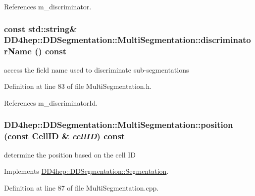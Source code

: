 References m\_\-discriminator.\hypertarget{class_d_d4hep_1_1_d_d_segmentation_1_1_multi_segmentation_a4be6f41c8a5f08fec8c2a5cc3cb47e6c}{
\subsubsection[{discriminatorName}]{\setlength{\rightskip}{0pt plus 5cm}const std::string\& DD4hep::DDSegmentation::MultiSegmentation::discriminatorName () const}}
\label{class_d_d4hep_1_1_d_d_segmentation_1_1_multi_segmentation_a4be6f41c8a5f08fec8c2a5cc3cb47e6c}


access the field name used to discriminate sub-\/segmentations 

Definition at line 83 of file MultiSegmentation.h.

References m\_\-discriminatorId.\hypertarget{class_d_d4hep_1_1_d_d_segmentation_1_1_multi_segmentation_abbcc00c36274bb97c5ff3d01d64e45b6}{
\subsubsection[{position}]{ DD4hep::DDSegmentation::MultiSegmentation::position (const {\bf CellID} \& {\em cellID}) const}}
\label{class_d_d4hep_1_1_d_d_segmentation_1_1_multi_segmentation_abbcc00c36274bb97c5ff3d01d64e45b6}


determine the position based on the cell ID 

Implements \hyperlink{class_d_d4hep_1_1_d_d_segmentation_1_1_segmentation_a594fe6d78667415855858d083b64acad}{DD4hep::DDSegmentation::Segmentation}.

Definition at line 87 of file MultiSegmentation.cpp.


